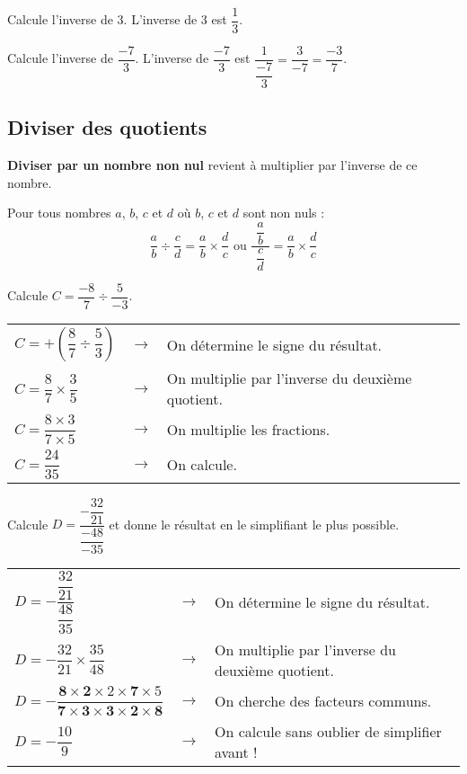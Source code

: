 \begin{exemple}
Calcule l'inverse de 3.
\correction
L'inverse de 3 est $\dfrac{1}{3}$.
\end{exemple}

\begin{exemple}
Calcule l'inverse de $\dfrac{-7}{3}$.
\correction
L'inverse de $\dfrac{-7}{3}$ est $\dfrac{1}{\dfrac{-7}{3}}=\dfrac{3}{-7}=\dfrac{-3}{7}$.
\end{exemple}

\subsection{Diviser des quotients}

\begin{aconnaitre}
\textbf{Diviser par un nombre non nul} revient à multiplier par l'inverse de ce nombre.

Pour tous nombres $a$, $b$, $c$ et $d$ où $b$, $c$ et $d$ sont non nuls :
\[ \dfrac{a}{b} \div \dfrac{c}{d} = \dfrac{a}{b} \times \dfrac{d}{c} \text{ ou } \dfrac{\phantom{i}\dfrac{a}{b}\phantom{i}}{\dfrac{c}{d}}=\dfrac{a}{b} \times \dfrac{d}{c} \]
\end{aconnaitre}

\begin{exemple*1}
Calcule $C=\dfrac{-8}{7} \div \dfrac{5}{-3}$.
\correction
\vspace{.5em}
 
\begin{tabular}{lll}
$C=+\left(\dfrac{8}{7} \div \dfrac{5}{3}\right)$ & $\longrightarrow$ & On détermine le signe du résultat. \\
$C=\dfrac{8}{7} \times \dfrac{3}{5}$ & $\longrightarrow$ & On multiplie par l'inverse du deuxième quotient. \\
$C=\dfrac{8\times 3}{7\times 5}$ & $\longrightarrow$ & On multiplie les fractions. \\
$C=\dfrac{24}{35}$ & $\longrightarrow$ & On calcule. \\
\end{tabular}
\end{exemple*1}


\begin{exemple*1}
Calcule $D=\dfrac{-\dfrac{32}{21}}{\dfrac{-48}{-35}}$ et donne le résultat en le simplifiant le plus possible.
\correction
\vspace{.5em}
 
\begin{tabular}{lll}
$D=-\dfrac{\dfrac{32}{21}}{\dfrac{48}{35}}$ & $\longrightarrow$ & On détermine le signe du résultat. \\
$D=-\dfrac{32}{21}\times \dfrac{35}{48}$ & $\longrightarrow$ & On multiplie par l'inverse du deuxième quotient. \\
$D=-\dfrac{\mathbf{8}\times \mathbf{2}\times 2 \times \mathbf{7} \times 5}{\mathbf{7 \times 3 \times 3 \times \mathbf{2} \times \mathbf{8}}}$ & $\longrightarrow$ & On cherche des facteurs communs. \\
$D=-\dfrac{10}{9}$ & $\longrightarrow$ & On calcule sans oublier de simplifier avant ! \\
\end{tabular}
\end{exemple*1}


